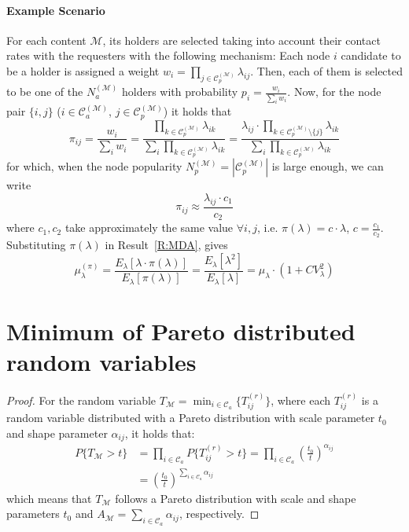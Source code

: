 \documentclass[journal]{IEEEtran}
\newcommand{\Np}{N_{p}^{(\mathcal{M})}}
\newcommand{\Na}{N_{a}^{(\mathcal{M})}}
\newcommand{\Cp}{\mathcal{C}_{p}^{(\mathcal{M})}}
\newcommand{\Ca}{\mathcal{C}_{a}^{(\mathcal{M})}}
\begin{document}
\paragraph*{Example Scenario} For each content $\mathcal{M}$, its holders are selected taking into account their contact rates with the requesters with the following mechanism: Each node $i$ candidate to be a holder is assigned a weight $w_{i} = \prod_{j\in\Cp}\lambda_{ij}$. Then, each of them is selected to be one of the $\Na$ holders with probability $p_{i} = \frac{w_{i}}{\sum_{i}w_{i}}$. Now, for the node pair $\{i,j\}$ ($i\in\Ca$, $j\in\Cp$) it holds that
\begin{equation}
 \pi_{ij} = \frac{w_{i}}{\sum_{i}w_{i}}= \frac{\prod_{k\in\Cp}\lambda_{ik}}{\sum_{i}\prod_{k\in\Cp}\lambda_{ik}}=\frac{\lambda_{ij}\cdot \prod_{k\in\Cp\setminus\{j\}}\lambda_{ik}}{\sum_{i}\prod_{k\in\Cp}\lambda_{ik}}
\end{equation}
for which, when the node popularity $\Np=|\Cp|$ is large enough, we can write
\begin{equation}
 \pi_{ij} \approx \frac{\lambda_{ij}\cdot c_{1}}{c_{2}}
\end{equation}
where $c_{1},c_{2}$ take approximately the same value $\forall i,j$, i.e. $\pi(\lambda) = c\cdot \lambda$, $c=\frac{c_{1}}{c_{2}}$. Substituting $\pi(\lambda)$ in Result~\ref{R:MDA}, gives
\begin{equation}
 \mu_{\lambda}^{(\pi)} = \frac{E_{\lambda}[\lambda\cdot \pi(\lambda)]}{E_{\lambda}[\pi(\lambda)]}=\frac{E_{\lambda}[\lambda^{2}]}{E_{\lambda}[\lambda]} = \mu_{\lambda}\cdot(1+CV_{\lambda}^{2})
\end{equation}



\section{Minimum of Pareto distributed random variables}\label{appendix:min-pareto}

\begin{proof}
For the random variable $T_{\mathcal{M}} = \min_{i\in\mathcal{C}_{a}}\lbrace T_{ij}^{(r)}\rbrace$, where each $T_{ij}^{(r)}$ is a random variable distributed with a Pareto distribution with scale parameter $t_{0}$ and shape parameter $\alpha_{ij}$, it holds that:
\begin{align}
P\lbrace T_{\mathcal{M}}>t\rbrace 	&= \prod_{i\in\mathcal{C}_{a}} P\lbrace T_{ij}^{(r)}>t\rbrace = \prod_{i\in\mathcal{C}_{a}} \left(\frac{t_{0}}{t}\right)^{\alpha_{ij}}\nonumber\\
									&= \left(\frac{t_{0}}{t}\right)^{\sum_{i\in\mathcal{C}_{a}} \alpha_{ij}}
\end{align}
which means that $T_{\mathcal{M}}$ follows a Pareto distribution with scale and shape parameters $t_{0}$ and $A_{\mathcal{M}}=\sum_{i\in\mathcal{C}_{a}} \alpha_{ij}$, respectively. 
\end{proof}
\end{document}
